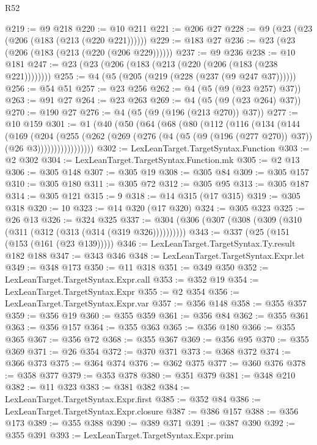 \begin{lexlean}{R52}
\begin{coremodule}
@219 := @9 @218
@220 := @10 @211
@221 := @206 @27
@228 := @9 (@23 (@23 (@206 (@183 (@213 (@220 @221))))))
@229 := @183 @27
@236 := @23 (@23 (@206 (@183 (@213 (@220 (@206 @229))))))
@237 := @9 @236
@238 := @10 @181
@247 := @23 (@23 (@206 (@183 (@213 (@220 (@206 (@183 (@238 @221))))))))
@255 := @4 (@5 (@205 (@219 (@228 (@237 (@9 @247 @37))))))
@256 := @54 @51
@257 := @23 @256
@262 := @4 (@5 (@9 (@23 @257) @37))
@263 := @91 @27
@264 := @23 @263
@269 := @4 (@5 (@9 (@23 @264) @37))
@270 := @190 @27
@276 := @4 (@5 (@9 (@196 (@213 @270)) @37))
@277 := @10 @159
@301 := @1
    (@40
      (@50
        (@64
          (@68
            (@80
              (@112
                (@116
                  (@134
                    (@144
                      (@169
                        (@204
                          (@255
                            (@262
                              (@269
                                (@276 (@4 (@5 (@9 (@196 (@277 @270)) @37)) (@26 @3)))))))))))))))))
@302 := LexLeanTarget.TargetSyntax.Function
@303 := @2 @302
@304 := LexLeanTarget.TargetSyntax.Function.mk
@305 := @2 @13
@306 := @305 @148
@307 := @305 @19
@308 := @305 @84
@309 := @305 @157
@310 := @305 @180
@311 := @305 @72
@312 := @305 @95
@313 := @305 @187
@314 := @305 @121
@315 := 9
@318 := @14 @315 (@17 @315)
@319 := @305 @318
@320 := 10
@323 := @14 @320 (@17 @320)
@324 := @305 @323
@325 := @26 @13
@326 := @324 @325
@337 := @304 (@306 (@307 (@308 (@309 (@310 (@311 (@312 (@313 (@314 (@319 @326))))))))))
@343 := @337 (@25 (@151 (@153 (@161 (@23 @139)))))
@346 := LexLeanTarget.TargetSyntax.Ty.result @182 @188
@347 := @343 @346
@348 := LexLeanTarget.TargetSyntax.Expr.let
@349 := @348 @173
@350 := @11 @318
@351 := @349 @350
@352 := LexLeanTarget.TargetSyntax.Expr.call
@353 := @352 @19
@354 := LexLeanTarget.TargetSyntax.Expr
@355 := @2 @354
@356 := LexLeanTarget.TargetSyntax.Expr.var
@357 := @356 @148
@358 := @355 @357
@359 := @356 @19
@360 := @355 @359
@361 := @356 @84
@362 := @355 @361
@363 := @356 @157
@364 := @355 @363
@365 := @356 @180
@366 := @355 @365
@367 := @356 @72
@368 := @355 @367
@369 := @356 @95
@370 := @355 @369
@371 := @26 @354
@372 := @370 @371
@373 := @368 @372
@374 := @366 @373
@375 := @364 @374
@376 := @362 @375
@377 := @360 @376
@378 := @358 @377
@379 := @353 @378
@380 := @351 @379
@381 := @348 @210
@382 := @11 @323
@383 := @381 @382
@384 := LexLeanTarget.TargetSyntax.Expr.first
@385 := @352 @84
@386 := LexLeanTarget.TargetSyntax.Expr.closure
@387 := @386 @157
@388 := @356 @173
@389 := @355 @388
@390 := @389 @371
@391 := @387 @390
@392 := @355 @391
@393 := LexLeanTarget.TargetSyntax.Expr.prim

\end{coremodule}
\end{lexlean}

